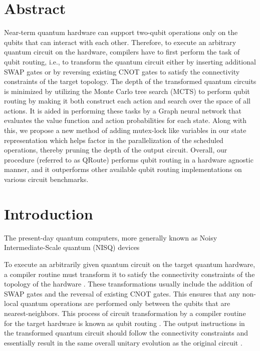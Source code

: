 \section{\label{sec:abstract}Abstract}

Near-term quantum hardware can support two-qubit operations only on the qubits that can interact with each other. Therefore, to execute an arbitrary quantum circuit on the hardware, compilers have to first perform the task of qubit routing, i.e., to transform the quantum circuit either by inserting additional SWAP gates or by reversing existing CNOT gates to satisfy the connectivity constraints of the target topology.  The depth of the transformed quantum circuits is minimized by utilizing the Monte Carlo tree search (MCTS) to perform qubit routing by making it both construct each action and search over the space of all actions. It is aided in performing these tasks by a Graph neural network that evaluates the value function and action probabilities for each state. Along with this, we propose a new method of adding mutex-lock like variables in our state representation which helps factor in the parallelization of the scheduled operations, thereby pruning the depth of the output circuit. Overall, our procedure (referred to as QRoute) performs qubit routing in a hardware agnostic manner, and it outperforms other available qubit routing implementations on various circuit benchmarks.


\section{\label{sec:intro}Introduction}

The present-day quantum computers, more generally known as Noisy Intermediate-Scale quantum (NISQ) devices \cite{nisq_preskill} 

To execute an arbitrarily given quantum circuit on the target quantum hardware, a compiler routine must transform it to satisfy the connectivity constraints of the topology of the hardware \cite{qroute_tket}. These transformations usually include the addition of SWAP gates and the reversal of existing CNOT gates. This ensures that any non-local quantum operations are performed only between the qubits that are nearest-neighbors. This process of circuit transformation by a compiler routine for the target hardware is known as qubit routing \cite{qroute_tket}. The output instructions in the transformed quantum circuit should follow the connectivity constraints and essentially result in the same overall unitary evolution as the original circuit \cite{qroute_dqn2}.

